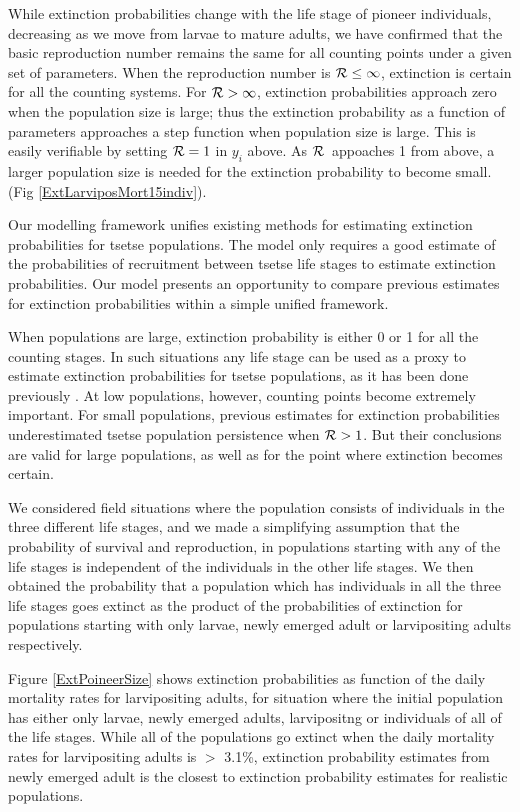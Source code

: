 \documentclass[smallextended]{svjour3}
\newcommand{\Rx}{\ensuremath{\cal R}}
\begin{document}
While extinction probabilities change with the life stage of pioneer individuals, decreasing as we move from larvae to mature adults,  we have confirmed that the basic reproduction number remains the same for all counting points under a given set of parameters. When the reproduction number is $ \Rx \leq 1$, extinction is certain for all the counting systems. For $\Rx>1$, extinction probabilities approach zero when the population size is large; thus the extinction probability as a function of parameters approaches a step function when population size is large. This is easily verifiable by setting ${\cal R} =1$ in $y_i$ above.  As \Rx\ appoaches 1 from above, a larger population size is needed for the extinction probability to become small. (Fig  \ref{ExtLarviposMort15indiv}).

Our modelling framework unifies existing methods for estimating extinction probabilities for tsetse populations. The model only requires a good estimate of the probabilities of recruitment between tsetse life stages to estimate extinction probabilities. Our model presents an opportunity to compare previous estimates for extinction probabilities within a simple unified framework.

When populations are large, extinction probability is either 0 or 1 for all the counting stages. In such situations any life stage can be used as a proxy to estimate extinction probabilities for tsetse populations, as it has been done previously \cite{Hargrove2005a,Kajunguri2019}. At low populations, however, counting points become extremely important. For small populations, previous estimates for extinction probabilities underestimated tsetse population persistence when ${\cal R} > 1$. But their conclusions are valid for large populations, as well as for the point where extinction becomes certain.

We considered field situations where the population consists of individuals in the three different life stages, and we made a simplifying assumption that the probability of survival and reproduction, in populations starting with any of the life stages is independent of the individuals in the other life stages. We then obtained the probability that a population which has individuals in all the three life stages goes extinct as the product of the probabilities of extinction for populations starting with only larvae, newly emerged adult or larvipositing adults respectively. 

Figure \ref{ExtPoineerSize} shows extinction probabilities as function of the daily mortality rates for larvipositing adults, for situation where the initial population has either only larvae, newly emerged adults, larvipositng or individuals of all of the life stages. While all of the populations go extinct when the daily mortality rates for larvipositing adults is $>$ 3.1\%, extinction probability estimates from newly emerged adult is the closest to extinction probability estimates for realistic populations. 
\end{document}
